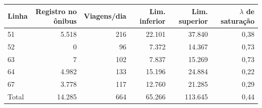 \begin{tabular}{lrrrrr}
\toprule
Linha & Registro no ônibus & Viagens/dia & Lim. inferior & Lim. superior & $\lambda$ de saturação \\
\midrule
51 & 5.518 & 216 & 22.101 & 37.840 & 0{,}38 \\
52 & 0 & 96 & 7.372 & 14.367 & 0{,}73 \\
63 & 7 & 102 & 7.837 & 15.269 & 0{,}73 \\
64 & 4.982 & 133 & 15.196 & 24.884 & 0{,}22 \\
67 & 3.778 & 117 & 12.760 & 21.285 & 0{,}29 \\
\midrule
Total & 14.285 & 664 & 65.266 & 113.645 & 0{,}44 \\
\bottomrule
\end{tabular}

